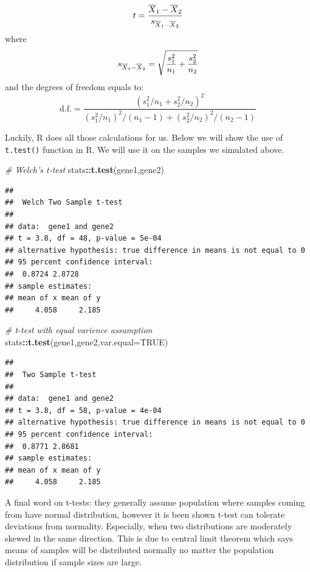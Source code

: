 \documentclass[12pt,]{krantz}
\newenvironment{Shaded}{\begin{snugshade}}{\end{snugshade}}
\newcommand{\CommentTok}[1]{\textcolor[rgb]{0.56,0.35,0.01}{\textit{#1}}}
\newcommand{\DataTypeTok}[1]{\textcolor[rgb]{0.13,0.29,0.53}{#1}}
\newcommand{\KeywordTok}[1]{\textcolor[rgb]{0.13,0.29,0.53}{\textbf{#1}}}
\newcommand{\NormalTok}[1]{#1}
\newcommand{\OperatorTok}[1]{\textcolor[rgb]{0.81,0.36,0.00}{\textbf{#1}}}
\newcommand{\OtherTok}[1]{\textcolor[rgb]{0.56,0.35,0.01}{#1}}
\theoremstyle{definition}
\theoremstyle{definition}
\theoremstyle{definition}
\theoremstyle{remark}
\begin{document}
\[t = {\overline{X}_1 - \overline{X}_2 \over s_{\overline{X}_1 - \overline{X}_2}}\]
where
\[s_{\overline{X}_1 - \overline{X}_2} = \sqrt{{s_1^2 \over n_1} + {s_2^2  \over n_2}}
\] and the degrees of freedom equals to:
\[\mathrm{d.f.} = \frac{(s_1^2/n_1 + s_2^2/n_2)^2}{(s_1^2/n_1)^2/(n_1-1) + (s_2^2/n_2)^2/(n_2-1)}
\]

Luckily, R does all those calculations for us. Below we will show the
use of \texttt{t.test()} function in R. We will use it on the samples we
simulated above.

\begin{Shaded}
\begin{Highlighting}[]
\CommentTok{# Welch's t-test}
\NormalTok{stats}\OperatorTok{::}\KeywordTok{t.test}\NormalTok{(gene1,gene2)}
\end{Highlighting}
\end{Shaded}

\begin{verbatim}
## 
##  Welch Two Sample t-test
## 
## data:  gene1 and gene2
## t = 3.8, df = 48, p-value = 5e-04
## alternative hypothesis: true difference in means is not equal to 0
## 95 percent confidence interval:
##  0.8724 2.8728
## sample estimates:
## mean of x mean of y 
##     4.058     2.185
\end{verbatim}

\begin{Shaded}
\begin{Highlighting}[]
\CommentTok{# t-test with equal varience assumption}
\NormalTok{stats}\OperatorTok{::}\KeywordTok{t.test}\NormalTok{(gene1,gene2,}\DataTypeTok{var.equal=}\OtherTok{TRUE}\NormalTok{)}
\end{Highlighting}
\end{Shaded}

\begin{verbatim}
## 
##  Two Sample t-test
## 
## data:  gene1 and gene2
## t = 3.8, df = 58, p-value = 4e-04
## alternative hypothesis: true difference in means is not equal to 0
## 95 percent confidence interval:
##  0.8771 2.8681
## sample estimates:
## mean of x mean of y 
##     4.058     2.185
\end{verbatim}

A final word on t-tests: they generally assume population where samples
coming from have normal distribution, however it is been shown t-test
can tolerate deviations from normality. Especially, when two
distributions are moderately skewed in the same direction. This is due
to central limit theorem which says means of samples will be distributed
normally no matter the population distribution if sample sizes are
large.
\end{document}
